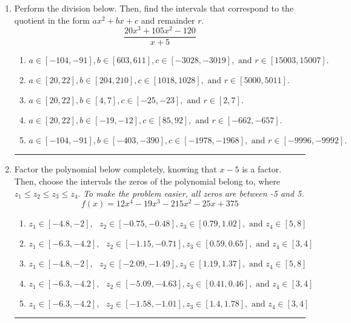 \documentclass[14pt]{extbook}
\newcommand{\litem}[1]{\item#1\hspace*{-1cm}\rule{\textwidth}{0.4pt}}
\begin{document}
\begin{enumerate}
{\begin{enumerate}[label=\Alph*.]
\end{enumerate} }
\litem{
Perform the division below. Then, find the intervals that correspond to the quotient in the form $ax^2+bx+c$ and remainder $r$.\[ \frac{20x^{3} +105 x^{2} -120}{x + 5} \]\begin{enumerate}[label=\Alph*.]
\item \( a \in [-104, -91], b \in [603, 611], c \in [-3028, -3019], \text{ and } r \in [15003, 15007]. \)
\item \( a \in [20, 22], b \in [204, 210], c \in [1018, 1028], \text{ and } r \in [5000, 5011]. \)
\item \( a \in [20, 22], b \in [4, 7], c \in [-25, -23], \text{ and } r \in [2, 7]. \)
\item \( a \in [20, 22], b \in [-19, -12], c \in [85, 92], \text{ and } r \in [-662, -657]. \)
\item \( a \in [-104, -91], b \in [-403, -390], c \in [-1978, -1968], \text{ and } r \in [-9996, -9992]. \)

\end{enumerate} }
\litem{
Factor the polynomial below completely, knowing that $x-5$ is a factor. Then, choose the intervals the zeros of the polynomial belong to, where $z_1 \leq z_2 \leq z_3 \leq z_4$. \textit{To make the problem easier, all zeros are between -5 and 5.}\[ f(x) = 12x^{4} -19 x^{3} -215 x^{2} -25 x + 375 \]\begin{enumerate}[label=\Alph*.]
\item \( z_1 \in [-4.8, -2], \text{   }  z_2 \in [-0.75, -0.48], z_3 \in [0.79, 1.02], \text{   and   } z_4 \in [5, 8] \)
\item \( z_1 \in [-6.3, -4.2], \text{   }  z_2 \in [-1.15, -0.71], z_3 \in [0.59, 0.65], \text{   and   } z_4 \in [3, 4] \)
\item \( z_1 \in [-4.8, -2], \text{   }  z_2 \in [-2.09, -1.49], z_3 \in [1.19, 1.37], \text{   and   } z_4 \in [5, 8] \)
\item \( z_1 \in [-6.3, -4.2], \text{   }  z_2 \in [-5.09, -4.63], z_3 \in [0.41, 0.46], \text{   and   } z_4 \in [3, 4] \)
\item \( z_1 \in [-6.3, -4.2], \text{   }  z_2 \in [-1.58, -1.01], z_3 \in [1.4, 1.78], \text{   and   } z_4 \in [3, 4] \)

\end{enumerate} }
\end{enumerate}
\end{document}
